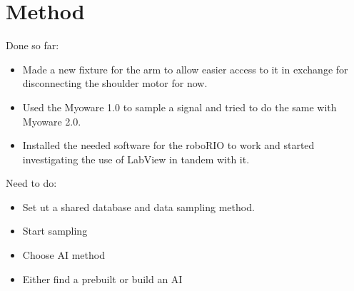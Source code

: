 \section{Method}
\label{section:method}





Done so far: 

\begin{itemize}
    
    \item Made a new fixture for the arm to allow easier access to it in exchange for disconnecting the shoulder motor for now.
    
    \item Used the Myoware 1.0 to sample a signal and tried to do the same with Myoware 2.0.
    
    \item Installed the needed software for the roboRIO to work and started investigating the use of LabView in tandem with it.
    
\end{itemize}
Need to do:
\begin{itemize}    
    \item Set ut a shared database and data sampling method.
    
    \item Start sampling
    
    \item Choose AI method
    
    \item Either find a prebuilt or build an AI
\end{itemize}